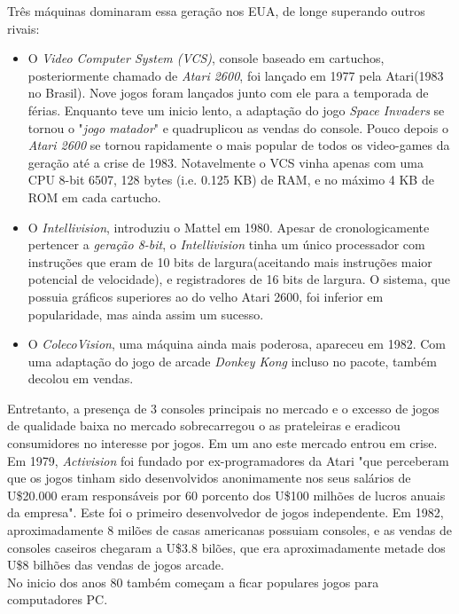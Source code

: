 \documentclass[paper=a4, fontsize=11pt]{scrartcl}	%
\numberwithin{equation}{section}															%
\numberwithin{figure}{section}																%
\numberwithin{table}{section}																%
\begin{document}
Três máquinas dominaram essa geração nos EUA, de longe superando outros rivais:\\
\begin{itemize}
\item O \textit{Video Computer System (VCS)}, console baseado em cartuchos, posteriormente chamado de \textit{Atari 2600}, foi lançado em 1977 pela Atari(1983 no Brasil). Nove jogos foram lançados junto com ele para a temporada de férias. Enquanto teve um inicio lento, a adaptação do jogo \textit{Space Invaders} se tornou o "\textit{jogo matador}" e quadruplicou as vendas do console. Pouco depois o \textit{Atari 2600} se tornou rapidamente o mais popular de todos os video-games da geração até a crise de 1983. Notavelmente o VCS vinha apenas com uma CPU 8-bit 6507, 128 bytes (i.e. 0.125 KB) de RAM, e no máximo 4 KB de ROM em cada cartucho.\\
\item O \textit{Intellivision}, introduziu o Mattel em 1980. Apesar de cronologicamente pertencer a \textit{geração 8-bit}, o \textit{Intellivision} tinha um único processador com instruções que eram de 10 bits de largura(aceitando mais instruções maior potencial de velocidade), e registradores de 16 bits de largura. O sistema, que possuia gráficos superiores ao do velho Atari 2600, foi inferior em popularidade, mas ainda assim um sucesso.\\
\item O \textit{ColecoVision}, uma máquina ainda mais poderosa, apareceu em 1982. Com uma adaptação do jogo de arcade \textit{Donkey Kong} incluso no pacote, também decolou em vendas. \\
\end{itemize}
Entretanto, a presença de 3 consoles principais no mercado e o excesso de jogos de qualidade baixa no mercado sobrecarregou o as prateleiras e eradicou consumidores no interesse por jogos. Em um ano este mercado entrou em crise.
Em 1979, \textit{Activision} foi fundado por ex-programadores da Atari "que perceberam que os jogos tinham sido desenvolvidos anonimamente nos seus salários de U\$20.000 eram responsáveis por 60 porcento dos U\$100 milhões de lucros anuais da empresa". Este foi o primeiro desenvolvedor de jogos independente. Em 1982, aproximadamente 8 milões de casas americanas possuiam consoles, e as vendas de consoles caseiros chegaram a U\$3.8 bilões, que era aproximadamente metade dos U\$8 bilhões das vendas de jogos arcade.\\
No inicio dos anos 80 também começam a ficar populares jogos para computadores PC.\\
\end{document}
